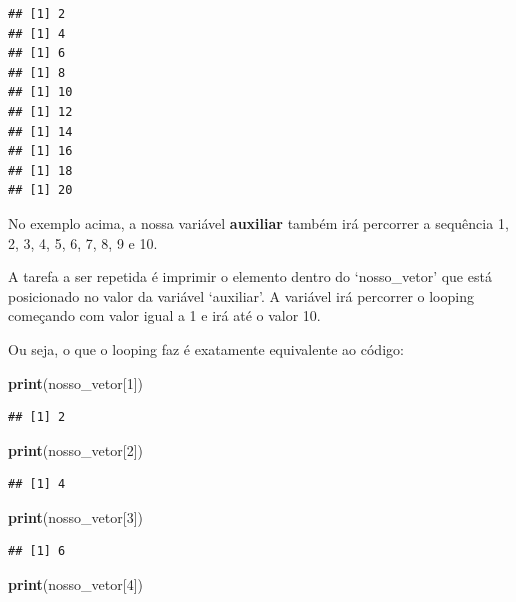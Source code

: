 \documentclass[
]{book}
\newenvironment{Shaded}{\begin{snugshade}}{\end{snugshade}}
\newcommand{\DecValTok}[1]{\textcolor[rgb]{0.00,0.00,0.81}{#1}}
\newcommand{\KeywordTok}[1]{\textcolor[rgb]{0.13,0.29,0.53}{\textbf{#1}}}
\newcommand{\NormalTok}[1]{#1}
\begin{document}
\begin{verbatim}
## [1] 2
## [1] 4
## [1] 6
## [1] 8
## [1] 10
## [1] 12
## [1] 14
## [1] 16
## [1] 18
## [1] 20
\end{verbatim}

No exemplo acima, a nossa variável \textbf{auxiliar} também irá
percorrer a sequência 1, 2, 3, 4, 5, 6, 7, 8, 9 e 10.

A tarefa a ser repetida é imprimir o elemento dentro do `nosso\_vetor'
que está posicionado no valor da variável `auxiliar'. A variável irá
percorrer o looping começando com valor igual a 1 e irá até o valor 10.

Ou seja, o que o looping faz é exatamente equivalente ao código:

\begin{Shaded}
\begin{Highlighting}[]
\KeywordTok{print}\NormalTok{(nosso_vetor[}\DecValTok{1}\NormalTok{])}
\end{Highlighting}
\end{Shaded}

\begin{verbatim}
## [1] 2
\end{verbatim}

\begin{Shaded}
\begin{Highlighting}[]
\KeywordTok{print}\NormalTok{(nosso_vetor[}\DecValTok{2}\NormalTok{])}
\end{Highlighting}
\end{Shaded}

\begin{verbatim}
## [1] 4
\end{verbatim}

\begin{Shaded}
\begin{Highlighting}[]
\KeywordTok{print}\NormalTok{(nosso_vetor[}\DecValTok{3}\NormalTok{])}
\end{Highlighting}
\end{Shaded}

\begin{verbatim}
## [1] 6
\end{verbatim}

\begin{Shaded}
\begin{Highlighting}[]
\KeywordTok{print}\NormalTok{(nosso_vetor[}\DecValTok{4}\NormalTok{])}
\end{Highlighting}
\end{Shaded}
\end{document}
